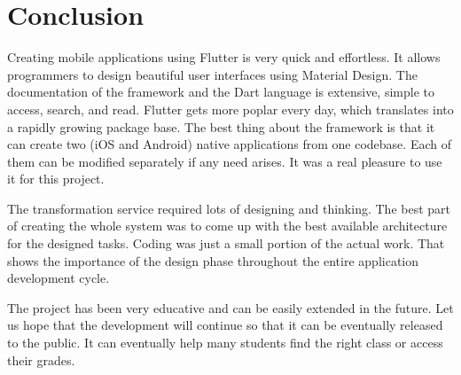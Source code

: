 \section{Conclusion}
Creating mobile applications using Flutter is very quick and effortless. It allows programmers to design beautiful user interfaces using Material Design. The documentation of the framework and the Dart language is extensive, simple to access, search, and read. Flutter gets more poplar every day, which translates into a rapidly growing package base. The best thing about the framework is that it can create two (iOS and Android) native applications from one codebase. Each of them can be modified separately if any need arises. It was a real pleasure to use it for this project.

The transformation service required lots of designing and thinking. The best part of creating the whole system was to come up with the best available architecture for the designed tasks. Coding was just a small portion of the actual work. That shows the importance of the design phase throughout the entire application development cycle.

The project has been very educative and can be easily extended in the future. Let us hope that the development will continue so that it can be eventually released to the public. It can eventually help many students find the right class or access their grades.
